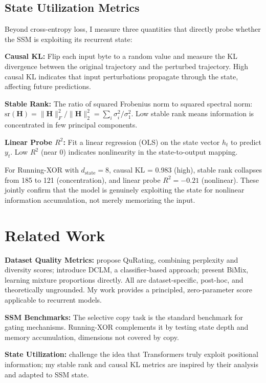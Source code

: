 \documentclass{article}
\begin{document}
\subsection{State Utilization Metrics}

Beyond cross-entropy loss, I measure three quantities that directly probe whether the SSM is exploiting its recurrent state:

\textbf{Causal KL:} Flip each input byte to a random value and measure the KL divergence between the original trajectory and the perturbed trajectory. High causal KL indicates that input perturbations propagate through the state, affecting future predictions.

\textbf{Stable Rank:} The ratio of squared Frobenius norm to squared spectral norm: $\text{sr}(\mathbf{H}) = \|\mathbf{H}\|_F^2 / \|\mathbf{H}\|_2^2 = \sum_i \sigma_i^2 / \sigma_1^2$. Low stable rank means information is concentrated in few principal components.

\textbf{Linear Probe $R^2$:} Fit a linear regression (OLS) on the state vector $h_t$ to predict $y_t$. Low $R^2$ (near 0) indicates nonlinearity in the state-to-output mapping.

For Running-XOR with $d_{\mathrm{state}} = 8$, causal KL = 0.983 (high), stable rank collapses from 185 to 121 (concentration), and linear probe $R^2 = -0.21$ (nonlinear). These jointly confirm that the model is genuinely exploiting the state for nonlinear information accumulation, not merely memorizing the input.

\section{Related Work}

\textbf{Dataset Quality Metrics:} \citet{qurating2024} propose QuRating, combining perplexity and diversity scores; \citet{dclm2024} introduce DCLM, a classifier-based approach; \citet{bimix2025} present BiMix, learning mixture proportions directly. All are dataset-specific, post-hoc, and theoretically ungrounded. My work provides a principled, zero-parameter score applicable to recurrent models.

\textbf{SSM Benchmarks:} The selective copy task \citep{gu2024mamba} is the standard benchmark for gating mechanisms. Running-XOR complements it by testing state depth and memory accumulation, dimensions not covered by copy.

\textbf{State Utilization:} \citet{merrill2024illusion} challenge the idea that Transformers truly exploit positional information; my stable rank and causal KL metrics are inspired by their analysis and adapted to SSM state.
\end{document}
